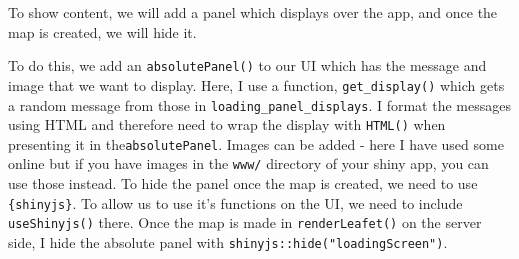 \documentclass[
]{book}
\begin{document}
To show content, we will add a panel which displays over the app, and once the map is created, we will hide it.

To do this, we add an \texttt{absolutePanel()} to our UI which has the message and image that we want to display. Here, I use a function, \texttt{get\_display()} which gets a random message from those in \texttt{loading\_panel\_displays}. I format the messages using HTML and therefore need to wrap the display with \texttt{HTML()} when presenting it in the\texttt{absolutePanel}. Images can be added - here I have used some online but if you have images in the \texttt{www/} directory of your shiny app, you can use those instead.
To hide the panel once the map is created, we need to use \texttt{\{shinyjs\}}. To allow us to use it's functions on the UI, we need to include \texttt{useShinyjs()} there. Once the map is made in \texttt{renderLeafet()} on the server side, I hide the absolute panel with \texttt{shinyjs::hide("loadingScreen")}.
\end{document}
